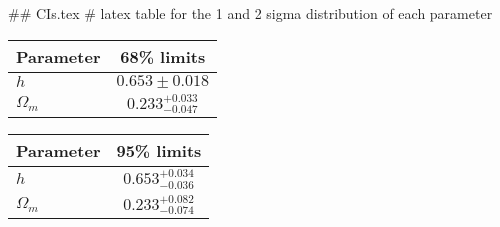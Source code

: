 ## CIs.tex
# latex table for the 1 and 2 sigma distribution of each parameter

\begin{tabular} { l  c}
 Parameter &  68\% limits\\
\hline
{\boldmath$h              $} & $0.653\pm 0.018            $\\
{\boldmath$\Omega_m       $} & $0.233^{+0.033}_{-0.047}   $\\
\hline
\end{tabular}

\begin{tabular} { l  c}
 Parameter &  95\% limits\\
\hline
{\boldmath$h              $} & $0.653^{+0.034}_{-0.036}   $\\
{\boldmath$\Omega_m       $} & $0.233^{+0.082}_{-0.074}   $\\
\hline
\end{tabular}

